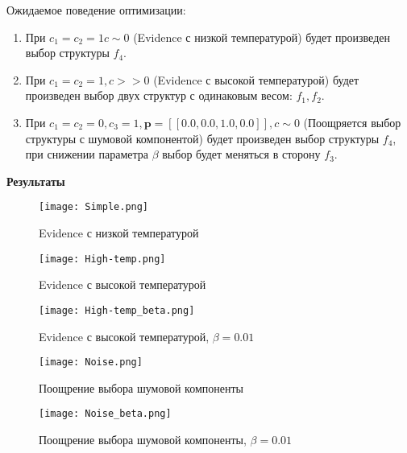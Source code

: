 \documentclass[12pt]{article}
\begin{document}
Ожидаемое поведение оптимизации:
\begin{enumerate}
\item При $c_1 = c_2 = 1 c \sim 0$ (Evidence с низкой температурой) будет произведен выбор структуры $f_4$.

\item При $c_1 = c_2 = 1, c >>0$ (Evidence с высокой температурой) будет произведен выбор двух структур с одинаковым весом: $f_1, f_2$.

\item При $c_1 = c_2 = 0, c_3 = 1, \mathbf{p}= [[0.0, 0.0, 1.0, 0.0]], c \sim 0$ (Поощряется выбор структуры с шумовой компонентой) будет произведен выбор структуры $f_4$, при снижении параметра $\beta$ выбор будет меняться в сторону $f_3$.
\end{enumerate}

\textbf{Результаты}\\
\begin{figure}
\texttt{[image: Simple.png]}
\caption{Evidence с низкой температурой}
\end{figure}

\begin{figure}
\texttt{[image: High-temp.png]}
\caption{Evidence с высокой температурой}
\end{figure}


\begin{figure}
\texttt{[image: High-temp\_beta.png]}
\caption{Evidence с высокой температурой, $\beta = 0.01$}
\end{figure}


\begin{figure}
\texttt{[image: Noise.png]}
\caption{Поощрение выбора шумовой компоненты}
\end{figure}


\begin{figure}
\texttt{[image: Noise\_beta.png]}
\caption{Поощрение выбора шумовой компоненты, $\beta = 0.01$}
\end{figure}
\end{document}
